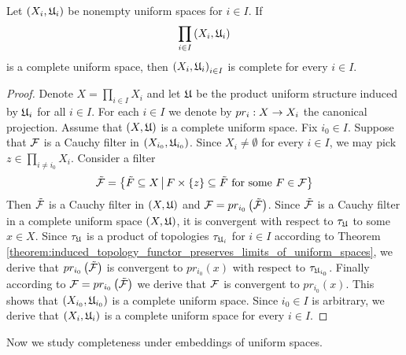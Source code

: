 \begin{theorem}\label{theorem:completeness_of_product_and_nonemptiness_of_factors_imply_their_completeness}
Let $\left(X_i,{\mathfrak U}_i\right)$ be nonempty uniform spaces for $i \in I$. If
$$\prod_{i\in I}\left(X_i,{\mathfrak U}_i\right)$$
is a complete uniform space, then $\left(X_i,{\mathfrak U}_i\right)_{i\in I}$ is complete for every $i \in I$.
\end{theorem}
\begin{proof}
Denote $X = \prod_{i\in I}X_i$ and let ${\mathfrak U}$ be the product uniform structure induced by ${\mathfrak U}_i$ for all $i\in I$. For each $i\in I$ we denote by $pr_i:X\rightarrow X_i$ the canonical projection. Assume that $(X,{\mathfrak U})$ is a complete uniform space. Fix $i_0 \in I$. Suppose that ${\mathcal F}$ is a Cauchy filter in $(X_{i_0},{\mathfrak U}_{i_0})$. Since $X_i\neq \emptyset$ for every $i\in I$, we may pick $z \in \prod_{i\neq i_0}X_i$. Consider a filter 
$$\tilde{{\mathcal F}} = \big\{\tilde{F}\subseteq X\,\big|\,F\times \{z\} \subseteq \tilde{F}\mbox{ for some }F\in {\mathcal F}\big\}$$
Then $\tilde{{\mathcal F}}$ is a Cauchy filter in $(X,{\mathfrak U})$ and ${\mathcal F} = pr_{i_0}\left(\tilde{{\mathcal F}}\right)$. Since $\tilde{{\mathcal F}}$ is a Cauchy filter in a complete uniform space $(X,{\mathfrak U})$, it is convergent with respect to $\tau_{{\mathfrak U}}$ to some $x \in X$. Since $\tau_{{\mathfrak U}}$ is a product of topologies $\tau_{{\mathfrak U}_i}$ for $i \in I$ according to Theorem \ref{theorem:induced_topology_functor_preserves_limits_of_uniform_spaces}, we derive that $pr_{i_0}\left(\tilde{{\mathcal F}}\right)$ is convergent to $pr_{i_0}(x)$ with respect to $\tau_{{\mathfrak U}_{i_0}}$. Finally according to ${\mathcal F} = pr_{i_0}\left(\tilde{{\mathcal F}}\right)$ we derive that ${\mathcal F}$ is convergent to $pr_{i_0}(x)$. This shows that $(X_{i_0},{\mathfrak U}_{i_0})$ is a complete uniform space. Since $i_0 \in I$ is arbitrary, we derive that $\left(X_i,{\mathfrak U}_i\right)$ is a complete uniform space for every $i \in I$.
\end{proof}
\noindent
Now we study completeness under embeddings of uniform spaces.

